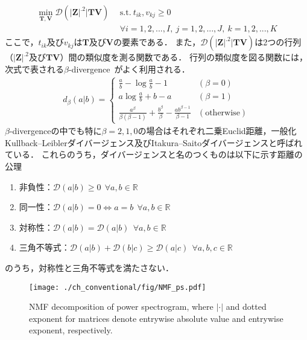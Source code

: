 \begin{align}
    \nonumber \min_{\bm{T,V}} \mathcal{D}(|\bm{Z}|^{.2} | \bm{TV}) ~~ & \mathrm{s.t.} ~ t_{ik}, v_{kj} \geq 0 \\ &\forall i = 1, 2, ..., I, ~j = 1, 2, ..., J, ~k = 1, 2, ..., K 
\end{align}
ここで，$t_{ik}$及び$v_{kj}$は$\bm{T}$及び$\bm{V}$の要素である．
また，$ \mathcal{D}(|\bm{Z}|^{.2} | \bm{TV})$は2つの行列（$|\bm{Z}|^{.2}$及び$\bm{TV}$）間の類似度を測る関数である．
行列の類似度を図る関数には，次式で表される$\beta$-divergence~\cite{psi-div, ext_nmf}がよく利用される\cite{pssnmf}．
\begin{align}
  d_{\beta}(a|b) = \left\{ \begin{array}{lll}
    \displaystyle \frac{a}{b} - \log \frac{a}{b} -1 & (\beta = 0) \\
    a \log \displaystyle\frac{a}{b} + b - a & (\beta =1) \\
    \displaystyle \frac{a^{\beta}}{\beta (\beta -1)} + \frac{b^{\beta}}{\beta} - \frac{ab^{\beta - 1}} {\beta - 1} & (\mathrm{otherwise}) 
  \end{array} \right. \label{eq:betad}
\end{align}
$\beta$-divergenceの中でも特に$\beta= 2,1,0$の場合はそれぞれ二乗Euclid距離，一般化Kullback--Leiblerダイバージェンス及びItakura--Saitoダイバージェンスと呼ばれている．
これらのうち，ダイバージェンスと名のつくものは以下に示す距離の公理
\begin{enumerate}
  \item 非負性：$\mathcal{D}(a|b) \geq 0 ~~\forall a,b \in \mathbb{R}$
  \item 同一性：$\mathcal{D}(a|b) = 0 \Leftrightarrow a = b~~\forall a,b \in \mathbb{R}$
  \item 対称性：$\mathcal{D}(a|b)= \mathcal{D}(a|b) ~~\forall a,b \in \mathbb{R}$
  \item 三角不等式：$\mathcal{D}(a|b) + \mathcal{D}(b|c) \geq \mathcal{D}(a|c) ~~\forall a,b,c \in \mathbb{R}$
\end{enumerate}
のうち，対称性と三角不等式を満たさない．
\begin{figure}[!t]
\centering
\texttt{[image: ./ch\_conventional/fig/NMF\_ps.pdf]}
\caption{NMF decomposition of power spectrogram, where $| \cdot |$  and dotted exponent for matrices denote entrywise absolute value and entrywise exponent, respectively.}
\label{fig:nmf_ps}
\end{figure}

